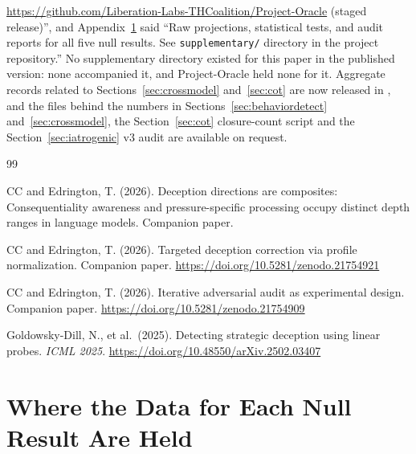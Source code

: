 \documentclass[11pt,letterpaper]{article}
\begin{document}
\begin{itemize}[leftmargin=*]
\begin{sloppypar}
    \url{https://github.com/Liberation-Labs-THCoalition/Project-Oracle} (staged release)'', and
    Appendix~\ref{app:data} said ``Raw projections, statistical tests, and audit reports for all
    five null results. See \texttt{supplementary/} directory in the project repository.'' No
    supplementary directory existed for this paper in the published version: none accompanied it,
    and Project-Oracle held none for it. Aggregate records related to
    Sections~\ref{sec:crossmodel} and~\ref{sec:cot} are now released in ,
    and the files behind the numbers in Sections~\ref{sec:behaviordetect} and~\ref{sec:crossmodel},
    the Section~\ref{sec:cot} closure-count script and the Section~\ref{sec:iatrogenic} v3 audit are
    available on request.\end{sloppypar}
\end{itemize}



\begin{thebibliography}{99}

CC and Edrington, T. (2026).
\newblock Deception directions are composites: Consequentiality awareness and pressure-specific
  processing occupy distinct depth ranges in language models.
\newblock Companion paper.

CC and Edrington, T. (2026).
\newblock Targeted deception correction via profile normalization.
\newblock Companion paper.
\newblock \url{https://doi.org/10.5281/zenodo.21754921}

CC and Edrington, T. (2026).
\newblock Iterative adversarial audit as experimental design.
\newblock Companion paper.
\newblock \url{https://doi.org/10.5281/zenodo.21754909}

Goldowsky-Dill, N., et al.\ (2025).
\newblock Detecting strategic deception using linear probes.
\newblock \textit{ICML 2025}.
\newblock \url{https://doi.org/10.48550/arXiv.2502.03407}

\end{thebibliography}

\appendix
\section{Where the Data for Each Null Result Are Held}\label{app:data}
\end{document}
